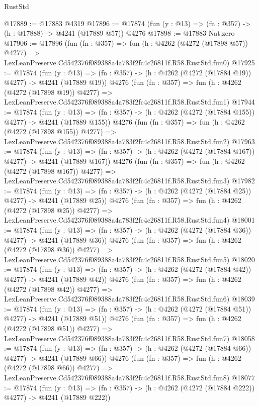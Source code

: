\begin{lexlean}{RustStd}
\begin{coremodule}
@17889 := @17883 @4319
@17896 := @17874 (fun (y : @13) => (fn : @357) -> (h : @17888) -> @4241 (@17889 @57)) @4276
@17898 := @17883 Nat.zero
@17906 := @17896
    (fun (fn : @357) =>
    fun (h : @4262 (@4272 (@17898 @57)) @4277) =>
    LexLeanPreserve.Cd542376f089388a4a783f2fc4c26811f.R58.RustStd.fun0)
@17925 := @17874
    (fun (y : @13) => (fn : @357) -> (h : @4262 (@4272 (@17884 @19)) @4277) -> @4241 (@17889 @19))
    @4276
    (fun (fn : @357) =>
    fun (h : @4262 (@4272 (@17898 @19)) @4277) =>
    LexLeanPreserve.Cd542376f089388a4a783f2fc4c26811f.R58.RustStd.fun1)
@17944 := @17874
    (fun (y : @13) => (fn : @357) -> (h : @4262 (@4272 (@17884 @155)) @4277) -> @4241 (@17889 @155))
    @4276
    (fun (fn : @357) =>
    fun (h : @4262 (@4272 (@17898 @155)) @4277) =>
    LexLeanPreserve.Cd542376f089388a4a783f2fc4c26811f.R58.RustStd.fun2)
@17963 := @17874
    (fun (y : @13) => (fn : @357) -> (h : @4262 (@4272 (@17884 @167)) @4277) -> @4241 (@17889 @167))
    @4276
    (fun (fn : @357) =>
    fun (h : @4262 (@4272 (@17898 @167)) @4277) =>
    LexLeanPreserve.Cd542376f089388a4a783f2fc4c26811f.R58.RustStd.fun3)
@17982 := @17874
    (fun (y : @13) => (fn : @357) -> (h : @4262 (@4272 (@17884 @25)) @4277) -> @4241 (@17889 @25))
    @4276
    (fun (fn : @357) =>
    fun (h : @4262 (@4272 (@17898 @25)) @4277) =>
    LexLeanPreserve.Cd542376f089388a4a783f2fc4c26811f.R58.RustStd.fun4)
@18001 := @17874
    (fun (y : @13) => (fn : @357) -> (h : @4262 (@4272 (@17884 @36)) @4277) -> @4241 (@17889 @36))
    @4276
    (fun (fn : @357) =>
    fun (h : @4262 (@4272 (@17898 @36)) @4277) =>
    LexLeanPreserve.Cd542376f089388a4a783f2fc4c26811f.R58.RustStd.fun5)
@18020 := @17874
    (fun (y : @13) => (fn : @357) -> (h : @4262 (@4272 (@17884 @42)) @4277) -> @4241 (@17889 @42))
    @4276
    (fun (fn : @357) =>
    fun (h : @4262 (@4272 (@17898 @42)) @4277) =>
    LexLeanPreserve.Cd542376f089388a4a783f2fc4c26811f.R58.RustStd.fun6)
@18039 := @17874
    (fun (y : @13) => (fn : @357) -> (h : @4262 (@4272 (@17884 @51)) @4277) -> @4241 (@17889 @51))
    @4276
    (fun (fn : @357) =>
    fun (h : @4262 (@4272 (@17898 @51)) @4277) =>
    LexLeanPreserve.Cd542376f089388a4a783f2fc4c26811f.R58.RustStd.fun7)
@18058 := @17874
    (fun (y : @13) => (fn : @357) -> (h : @4262 (@4272 (@17884 @66)) @4277) -> @4241 (@17889 @66))
    @4276
    (fun (fn : @357) =>
    fun (h : @4262 (@4272 (@17898 @66)) @4277) =>
    LexLeanPreserve.Cd542376f089388a4a783f2fc4c26811f.R58.RustStd.fun8)
@18077 := @17874
    (fun (y : @13) => (fn : @357) -> (h : @4262 (@4272 (@17884 @222)) @4277) -> @4241 (@17889 @222))

\end{coremodule}
\end{lexlean}
